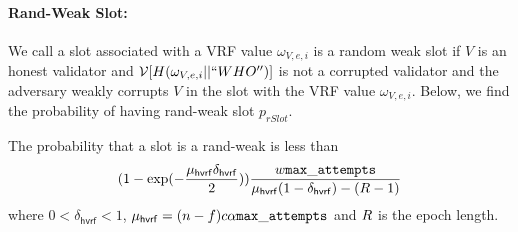 \paragraph{Rand-Weak Slot:} We call a slot associated with a VRF value $ \omega_{V,e,i} $ is a random weak slot  if $ V $ is an honest validator and $ \mathcal{V}[H(\omega_{V,e,i}||``WHO'')] $ is not a corrupted validator and the adversary weakly corrupts $ V $ in the slot with the VRF value $ \omega_{V,e,i} $.  Below, we find the probability of having rand-weak slot $ p_{rSlot} $.

\begin{lemma}
	The probability that a slot is a rand-weak is less than $$(1 - \exp(-\frac{\mu_{\mathsf{hvrf}}\delta_{\mathsf{hvrf}}}{2}))\frac{w \mathtt{max\_attempts} }{\mu_{\mathsf{hvrf}} (1- \delta_{\mathsf{hvrf}}) - (R  -1)} $$ where $ 0 < \delta_{\mathsf{hvrf}} < 1 $, $ \mu_{\mathsf{hvrf}} = (n-f)c\alpha\mathtt{max\_attempts} $ and  $ R  $ is the epoch length.
\end{lemma}

